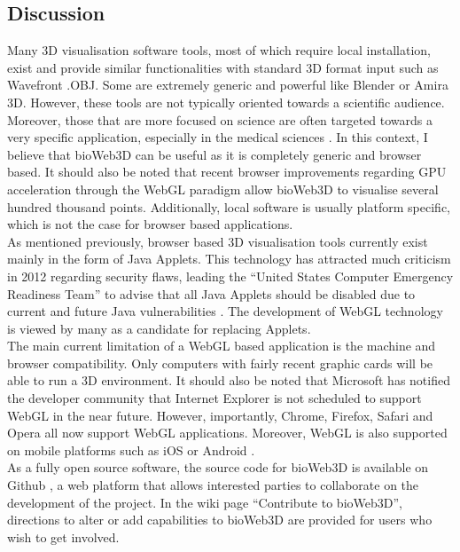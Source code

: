 	\subsection{Discussion}

Many 3D visualisation software tools, most of which require local installation, exist and provide similar functionalities with standard 3D format input such as Wavefront .OBJ. Some are extremely generic and powerful like Blender or Amira 3D. However, these tools are not typically oriented towards a scientific audience. Moreover, those that are more focused on science are often targeted towards a very specific application, especially in the medical sciences \citep{Wang093D}. In this context, I believe that bioWeb3D can be useful as it is completely generic and browser based. It should also be noted that recent browser improvements regarding GPU acceleration through the WebGL paradigm allow bioWeb3D to visualise several hundred thousand points. Additionally, local software is usually platform specific, which is not the case for browser based applications.\\

As mentioned previously, browser based 3D visualisation tools currently exist mainly in the form of Java Applets. This technology has attracted much criticism in 2012 regarding security flaws, leading the ``United States Computer Emergency Readiness Team'' to advise that all Java Applets should be disabled due to current and future Java vulnerabilities \citep{security}. The development of WebGL technology is viewed by many as a candidate for replacing Applets. \\


The main current limitation of a WebGL based application is the machine and browser compatibility. Only computers with fairly recent graphic cards will be able to run a 3D environment. It should also be noted that Microsoft has notified the developer community that Internet Explorer is not scheduled to support WebGL in the near future. However, importantly, Chrome, Firefox, Safari and Opera all now support WebGL applications. Moreover, WebGL is also supported on mobile platforms such as iOS or Android \citep{caniuse}.\\


As a fully open source software, the source code for bioWeb3D is available on Github \citep{github}, a web platform that allows interested parties to collaborate on the development of the project. In the wiki page ``Contribute to bioWeb3D'', directions to alter or add capabilities to bioWeb3D are provided for users who wish to get involved.

